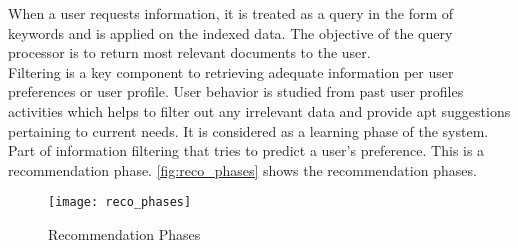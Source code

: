 When a user requests information, it is treated as a query in the form of keywords and is applied on the indexed data. The objective of the query processor is to return most relevant documents to the user.
\\
\noindent Filtering is a key component to retrieving adequate information per user preferences or user profile. User behavior is studied from past user profiles activities which helps to filter out any irrelevant data and provide apt suggestions pertaining to current needs. It is considered as a learning phase of the system. Part of information filtering that tries to predict a user's preference. This is a recommendation phase. \autoref{fig:reco_phases} shows the recommendation phases.\\
\begin{figure}[H]
	\centering
	\texttt{[image: reco\_phases]}
	\caption{Recommendation Phases \cite{33}}
	\label{fig:reco_phases}
\end{figure}
